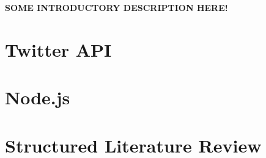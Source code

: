 
\textbf{SOME INTRODUCTORY DESCRIPTION HERE!}

\section{Twitter API}


\section{Node.js}
	

\section{Structured Literature Review}
